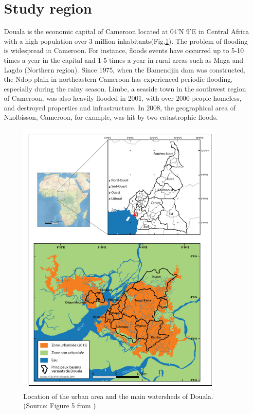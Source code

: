 \section{Study region}
Douala is the economic capital of Cameroon located at 04'N 9'E in Central Africa with a high population over 3 million inhabitants\cite{populationstatdouala2021}(Fig.\ref{fig:douala_city_map}). The problem of flooding is widespread in Cameroon\cite{bruckmann2019analyse,tangan2018community}. For instance, floods events have occurred up to 5-10 times a year in the capital and 1-5 times a year in rural areas such as Maga and Lagdo (Northern region)\cite{tangan2018community}. Since 1975, when the Bamendjin dam was constructed, the Ndop plain in northeastern Cameroon has experienced periodic flooding, especially during the rainy season\cite{sighomnou2005cameroon}. Limbe, a seaside town in the southwest region of Cameroon, was also heavily flooded in 2001, with over 2000 people homeless, and destroyed properties and infrastructure\cite{ngalim2020stakeholders}. In 2008, the geographical area of Nkolbisson, Cameroon, for example, was hit by two catastrophic floods\cite{bruckmann2019analyse,tangan2018community}. 
\begin{figure}[hbt!]
	\centering
	\includegraphics[width=0.8\linewidth]{figure/douala_city_map.png}
	\caption{Location of the urban area and the main watersheds of Douala. (Source: Figure 5 from \cite{bruckmann2019analyse})}
	\label{fig:douala_city_map}
\end{figure}

